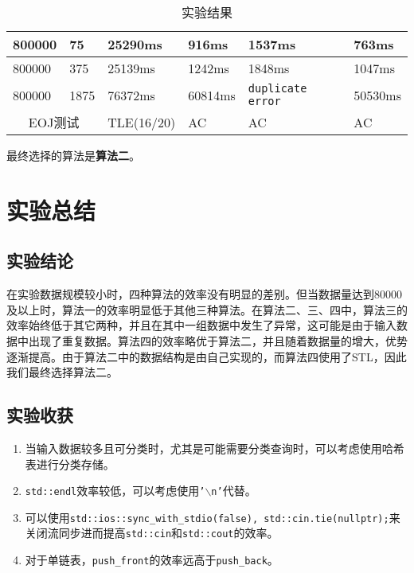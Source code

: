\documentclass{article}
\begin{document}
\begin{table}[H]
\begin{tabular}{|p{2.5cm}<{\centering}|p{3cm}<{\centering}|p{2.4cm}<{\centering}|p{2cm}<{\centering}|p{3.5cm}<{\centering}|p{2cm}<{\centering}|}
        \hline
        800000                        & 75            & 25290ms      & 916ms                & 1537ms                   & 763ms   \\
        \hline
        800000                        & 375           & 25139ms      & 1242ms               & 1848ms                   & 1047ms  \\
        \hline
        800000                        & 1875          & 76372ms      & 60814ms              & \texttt{duplicate error} & 50530ms \\
        \hline
        \multicolumn{2}{|c|}{EOJ测试} & TLE(16/20)    & AC           & AC                   & AC                                 \\
        \hline
    \end{tabular}
    \caption{实验结果}
\end{table}

最终选择的算法是\textbf{算法二}。
\normalsize
\section{实验总结}
\large

\subsection{实验结论}
在实验数据规模较小时，四种算法的效率没有明显的差别。但当数据量达到80000及以上时，算法一的效率明显低于其他三种算法。在算法二、三、四中，算法三的效率始终低于其它两种，并且在其中一组数据中发生了异常，这可能是由于输入数据中出现了重复数据。算法四的效率略优于算法二，并且随着数据量的增大，优势逐渐提高。由于算法二中的数据结构是由自己实现的，而算法四使用了STL，因此我们最终选择算法二。

\subsection{实验收获}
\begin{enumerate}[noitemsep]
    \item 当输入数据较多且可分类时，尤其是可能需要分类查询时，可以考虑使用哈希表进行分类存储。
    \item \texttt{std::endl}效率较低，可以考虑使用\texttt{'$\backslash$n'}代替。
    \item 可以使用\texttt{std::ios::sync\_with\_stdio(false), std::cin.tie(nullptr);}来关闭流同步进而提高\texttt{std::cin}和\texttt{std::cout}的效率。
    \item 对于单链表，\texttt{push\_front}的效率远高于\texttt{push\_back}。
\end{enumerate}
\end{document}
